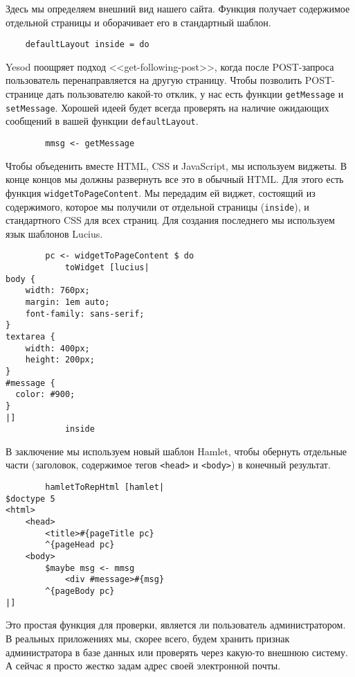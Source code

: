 Здесь мы определяем внешний вид нашего сайта. Функция получает содержимое отдельной страницы и оборачивает его в стандартный шаблон. 
 
\begin{lstlisting}
    defaultLayout inside = do
\end{lstlisting}
 
Yesod поощряет подход <<get-following-post>>, когда после POST-запроса пользователь перенаправляется на другую страницу. Чтобы позволить POST-странице дать пользователю какой-то отклик, у нас есть функции \lstinline!getMessage! и \lstinline!setMessage!. Хорошей идеей будет всегда проверять на наличие ожидающих сообщений в вашей функции \lstinline!defaultLayout!. 
 
\begin{lstlisting}
        mmsg <- getMessage
\end{lstlisting}

Чтобы объеденить вместе HTML, CSS и JavaScript, мы используем виджеты. В конце концов мы должны развернуть все это в обычный HTML. Для этого есть функция \lstinline!widgetToPageContent!. Мы передадим ей виджет, состоящий из содержимого, которое мы получили от отдельной страницы (\lstinline!inside!), и стандартного CSS для всех страниц. Для создания последнего мы используем язык шаблонов Lucius. 
 
\begin{lstlisting}
        pc <- widgetToPageContent $ do
            toWidget [lucius|
body {
    width: 760px;
    margin: 1em auto;
    font-family: sans-serif;
}
textarea {
    width: 400px;
    height: 200px;
}
#message {
  color: #900;
}
|]
            inside
\end{lstlisting}%
 
В заключение мы используем новый шаблон Hamlet, чтобы обернуть отдельные части (заголовок, содержимое тегов \lstinline!<head>! и \lstinline!<body>!) в конечный результат. 
 
\begin{lstlisting}
        hamletToRepHtml [hamlet|
$doctype 5
<html>
    <head>
        <title>#{pageTitle pc}
        ^{pageHead pc}
    <body>
        $maybe msg <- mmsg
            <div #message>#{msg}
        ^{pageBody pc}
|]
\end{lstlisting}
 
Это простая функция для проверки, является ли пользователь администратором. В реальных приложениях мы, скорее всего, будем хранить признак администратора в базе данных или проверять через какую-то внешнюю систему. А сейчас я просто жестко задам адрес своей электронной почты. 
 
